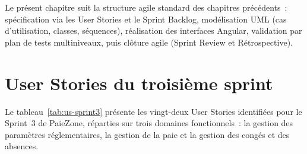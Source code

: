 Le présent chapitre suit la structure agile standard des chapitres
précédents~: spécification via les User Stories et le Sprint Backlog,
modélisation UML (cas d'utilisation, classes, séquences), réalisation
des interfaces Angular, validation par plan de tests multiniveaux,
puis clôture agile (Sprint Review et Rétrospective).

\section{User Stories du troisième sprint}
\label{sec:s3-userstories}

Le tableau~\ref{tab:us-sprint3} présente les vingt-deux User Stories
identifiées pour le Sprint~3 de PaieZone, réparties sur trois domaines
fonctionnels~: la gestion des paramètres réglementaires, la gestion
de la paie et la gestion des congés et des absences.

